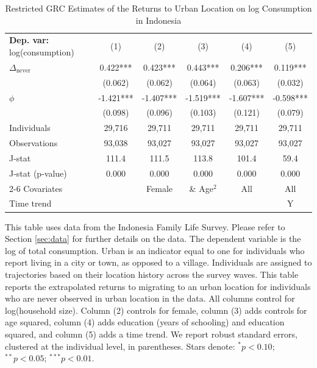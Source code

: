 \begin{table}[htbp] \centering \begin{threeparttable}
 \caption{Restricted GRC Estimates of the Returns to Urban Location on log Consumption in Indonesia} 
 \label{tab:GRC_IDN_cons_urb_unb} 
\begin{tabular}{l ccccc} \toprule  \textbf{Dep. var:}  log(consumption) 
                    &\multicolumn{1}{c}{(1)}   &\multicolumn{1}{c}{(2)}   &\multicolumn{1}{c}{(3)}   &\multicolumn{1}{c}{(4)}   &\multicolumn{1}{c}{(5)}   \\
\addlinespace
$\Delta_{\text{never}}$&    0.422***&       0.423***&       0.443***&       0.206***&       0.119***\\
                    &     (0.062)   &     (0.062)   &     (0.064)   &     (0.063)   &     (0.032)   \\
\addlinespace
$\phi$              &      -1.421***&      -1.407***&      -1.519***&      -1.607***&      -0.598***\\
                    &     (0.098)   &     (0.096)   &     (0.103)   &     (0.121)   &     (0.079)   \\
\addlinespace
Individuals         &      29,716   &      29,711   &      29,711   &      29,711   &      29,711   \\
Observations        &      93,038   &      93,027   &      93,027   &      93,027   &      93,027   \\
J-stat              &       111.4   &       111.5   &       113.8   &       101.4   &        59.4   \\
J-stat (p-value)    &       0.000   &       0.000   &       0.000   &       0.000   &       0.000   \\
\cmidrule{2-6} Covariates & & Female & \& Age$^2$ & All & All  \\ Time trend & & & & & Y \\ \bottomrule \end{tabular} \begin{tablenotes} \footnotesize \item{This table uses data from the Indonesia Family Life Survey. Please refer to Section \ref{sec:data} for further details on the data. The dependent variable is the log of total consumption. Urban is an indicator equal to one for individuals who report living in a city or town, as opposed to a village. Individuals are assigned to trajectories based on their location history across the survey waves. This table reports the extrapolated returns to migrating to an urban location for individuals who are never observed in urban location in the data. %
All columns control for log(household size). Column (2) controls for female, column (3) adds controls for age squared, column (4) adds education (years of schooling) and education squared, and column (5) adds a time trend.  We report robust standard errors, clustered at the individual level, in parentheses. Stars denote: $^{*} p<0.10$; $^{**} p<0.05$; $^{***} p<0.01$.} \end{tablenotes} \end{threeparttable} \end{table}
